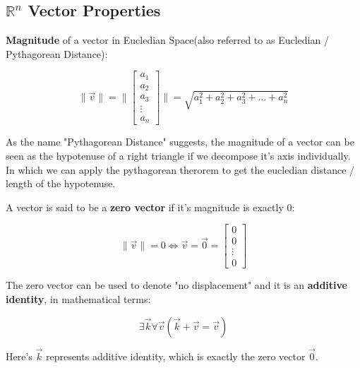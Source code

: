 \sgap


\subsection{$\mathbb{R}^n$ Vector Properties}

\textbf{Magnitude} of a vector in Eucledian Space(also referred to as Eucledian / Pythagorean Distance):
\begin{center}
    \[
        \|\vec{v}\|=\|\begin{bmatrix}a_1 \\ a_2 \\ a_3 \\ \vdots \\ a_n\end{bmatrix}\|=\sqrt{a_1^2+a_2^2+a_3^2+...+a_n^2}
    \]
\end{center}

As the name "Pythagorean Distance" suggests, the magnitude of a vector can be seen as the hypotenuse of a right triangle if we
decompose it's axis individually. In which we can apply the pythagorean therorem to get the eucledian distance / length of the hypotenuse.

\sgap
\begin{samepage}
    A vector is said to be a \textbf{zero vector} if it's magnitude is exactly $0$:
    \begin{center}
        \[
            \|\vec{v}\|=0 \iff \vec{v}=\vec{0}=\begin{bmatrix}0 \\ 0 \\ \vdots \\ 0\end{bmatrix}
        \]
    \end{center}

    The zero vector can be used to denote "no displacement" and it is an \textbf{additive identity}, in mathematical terms:
    \begin{center}
        \[
            \exists \vec{k} \forall \vec{v}(\vec{k}+\vec{v}=\vec{v})
        \]
    \end{center}

    Here's $\vec{k}$ represents additive identity, which is exactly the zero vector $\vec{0}$.
\end{samepage}


\sgap

